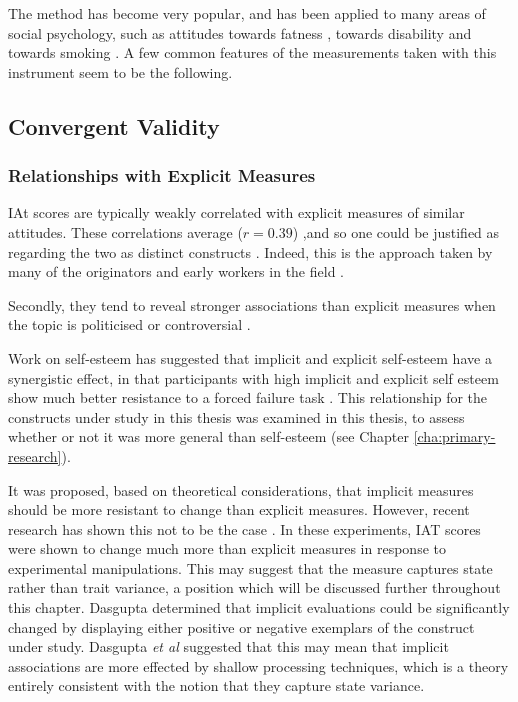 The method has become very popular, and has been applied to many areas of social psychology, such as attitudes towards fatness \cite{Ahern2008}, towards disability \cite{Pruett2006} and towards smoking \cite{Kahler2007}. A few common features of the measurements taken with this instrument seem to be the following. 

\subsection{Convergent Validity}
\label{sec:convergent-validity}



\subsubsection{Relationships with Explicit Measures}
\label{sec:relat-with-expl}



IAt scores are typically weakly correlated with explicit measures of similar attitudes. These correlations average ($r=0.39$) \cite{Nosek2005},and so one could be justified as regarding the two as distinct constructs \cite{Nosek2007a}. Indeed, this is the approach taken by many of the originators and early workers in the field \cite{Greenwald2000,Nosek2007a}. 

Secondly, they tend to reveal stronger associations than explicit measures when the topic is politicised or controversial \cite{Greenwald2009}. 

Work on self-esteem has suggested that implicit and explicit self-esteem have a synergistic effect, in that participants with high implicit and explicit self esteem show much better resistance to a forced failure task \cite{Meagher2004}. This relationship for the constructs under study in  this thesis was examined in this thesis, to assess whether or not it was more general than self-esteem (see Chapter \ref{cha:primary-research}). 

It was proposed, based on theoretical considerations, that implicit measures should be more resistant to change than explicit measures. However, recent research has shown this not to be the case \cite{Meagher2004,Gschwendner2008}. In these experiments, IAT scores were shown to change much more than explicit measures in response to experimental manipulations. This may suggest that the measure captures state rather than trait variance, a position which will be discussed further throughout this chapter. Dasgupta \cite{Dasgupta2001} determined that implicit evaluations could be significantly changed by displaying either positive or negative exemplars of the construct under study. Dasgupta \textit{et al} suggested that this may mean that implicit associations are more effected by shallow processing techniques, which is a theory entirely consistent with the notion that they capture state variance. 


